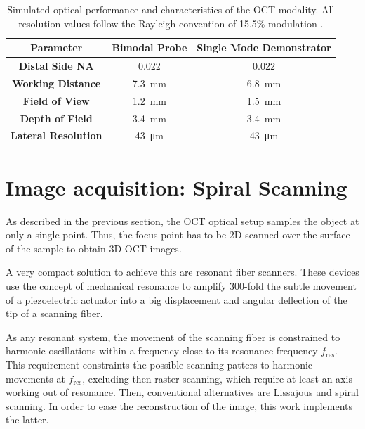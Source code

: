 \begin{table}[h!]\centering
	\caption{Simulated optical performance and characteristics of the OCT modality. All resolution values follow the Rayleigh convention of 15.5\% modulation \cite{Kretschmer}.}
	\begin{tabular}{ccc}\\
		\textbf{Parameter} & \textbf{Bimodal Probe} & \textbf{Single Mode Demonstrator} \\ 
		\hline
		\textbf{Distal Side NA} & 0.022 & 0.022 \\ 
		\textbf{Working Distance} & \SI{7.3}{\milli\meter} &  \SI{6.8}{\milli\meter} \\ 
		\textbf{Field of View} & \SI{1.2}{\milli\meter} &  \SI{1.5}{\milli\meter}\\ 
		\textbf{Depth of Field} & \SI{3.4}{\milli\meter}& \SI{3.4}{\milli\meter} \\ 
		\textbf{Lateral Resolution} & \SI{43}{\micro\meter} & \SI{43}{\micro\meter}\\ 
		\hline
	\end{tabular} 
    \label{tab:simRes}
\end{table}

\section{Image acquisition: Spiral Scanning}
\label{sec:spiralScanning}

As described in the previous section, the OCT optical setup samples the object at only a single point. Thus, the focus point has to be 2D-scanned over the surface of the sample to obtain 3D OCT images.

A very compact solution to achieve this are resonant fiber scanners. These devices use the concept of mechanical resonance to amplify 300-fold the subtle movement of a piezoelectric actuator into a big displacement and angular deflection of the tip of a scanning fiber. 

As any resonant system, the movement of the scanning fiber is constrained to harmonic oscillations within a frequency close to its resonance frequency $f_\mathrm{res}$. This requirement constraints the possible scanning patters to harmonic movements at $f_\mathrm{res}$, excluding then  raster scanning, which require at least an axis working out of resonance. Then, conventional alternatives are Lissajous \cite{Moon2010} and spiral scanning. In order to ease the reconstruction of the image, this work implements the latter.

